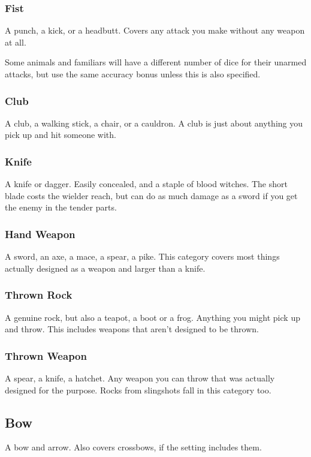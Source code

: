 \subsubsection{Fist}
A punch, a kick, or a headbutt.
Covers any attack you make without any weapon at all.

Some animals and familiars will have a different number of dice for their unarmed attacks, but use the same accuracy bonus unless this is also specified.

\subsubsection{Club}
A club, a walking stick, a chair, or a cauldron.
A club is just about anything you pick up and hit someone with.

\subsubsection{Knife}
A knife or dagger.
Easily concealed, and a staple of blood witches.
The short blade costs the wielder reach, but can do as much damage as a sword if you get the enemy in the tender parts.

\subsubsection{Hand Weapon}
A sword, an axe, a mace, a spear, a pike.
This category covers most things actually designed as a weapon and larger than a knife.

\subsubsection{Thrown Rock}
A genuine rock, but also a teapot, a boot or a frog.
Anything you might pick up and throw.
This includes weapons that aren't designed to be thrown.

\subsubsection{Thrown Weapon}
A spear, a knife, a hatchet.
Any weapon you can throw that was actually designed for the purpose.
Rocks from slingshots fall in this category too.

\subsection{Bow}
A bow and arrow.
Also covers crossbows, if the setting includes them.
